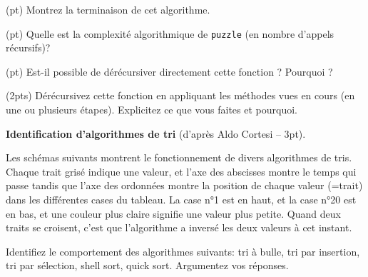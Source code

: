 \documentclass[10pt]{article}\usepackage[nu]{esial}
\begin{document}
\Question(\textonehalf pt)  Montrez la terminaison de cet algorithme. 

\Question(\textonehalf pt) Quelle est la complexité algorithmique de \texttt{puzzle} (en
nombre d'appels récursifs)? 

\Question(\textonehalf pt) Est-il possible de dérécursiver directement cette
fonction ? Pourquoi ? 

\Question(2pts) Dérécursivez cette fonction en appliquant les méthodes vues en cours
(en une ou plusieurs étapes). Explicitez ce que vous faites et
pourquoi. 


\medskip
\Exercice\textbf{Identification d'algorithmes de tri} (d'après Aldo Cortesi --
3pt).

Les schémas suivants montrent le fonctionnement de divers algorithmes de
tris. Chaque trait grisé indique une valeur, et l'axe des abscisses montre le
temps qui passe tandis que l'axe des ordonnées montre la position de chaque
valeur (=trait) dans les différentes cases du tableau. La case n°1 est en haut,
et la case n°20 est en bas, et une couleur plus claire signifie une valeur plus
petite. Quand deux traits se croisent, c'est que l'algorithme a inversé les
deux valeurs à cet instant.

\Question Identifiez le comportement des algorithmes suivants: tri à bulle, tri
par insertion, tri par sélection, shell sort, quick sort. Argumentez vos
réponses. 

\bigskip
\end{document}

